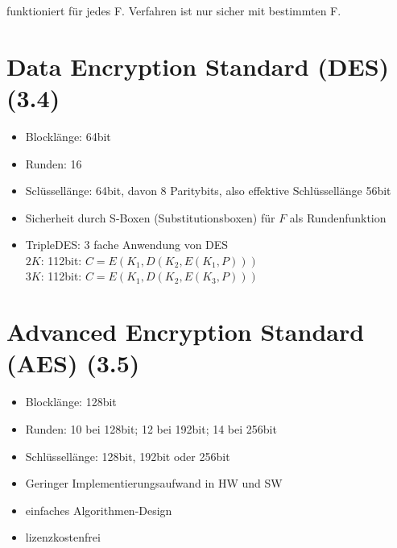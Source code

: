 funktioniert für jedes F. Verfahren ist nur sicher mit bestimmten F.

\section{Data Encryption Standard (DES) (3.4)}
\begin{itemize}
  \item Blocklänge: 64bit
  \item Runden: 16
  \item Sclüssellänge: 64bit, davon 8 Paritybits, also effektive Schlüssellänge 56bit
  \item Sicherheit durch S-Boxen (Substitutionsboxen) für $F$ als Rundenfunktion
  \item TripleDES: 3 fache Anwendung von DES \\
  	$2 K$: 112bit: $C=E(K_1,D(K_2,E(K_1,P)))$ \\
    $3 K$: 112bit: $C=E(K_1,D(K_2,E(K_3,P)))$ \\  
\end{itemize}

\section{Advanced Encryption Standard (AES) (3.5)}
\begin{itemize}
  \item Blocklänge: 128bit
	\item Runden: 10 bei 128bit; 12 bei 192bit; 14 bei 256bit
  \item Schlüssellänge: 128bit, 192bit oder 256bit
  \item Geringer Implementierungsaufwand in HW und SW
  \item einfaches Algorithmen-Design
  \item lizenzkostenfrei
\end{itemize}









